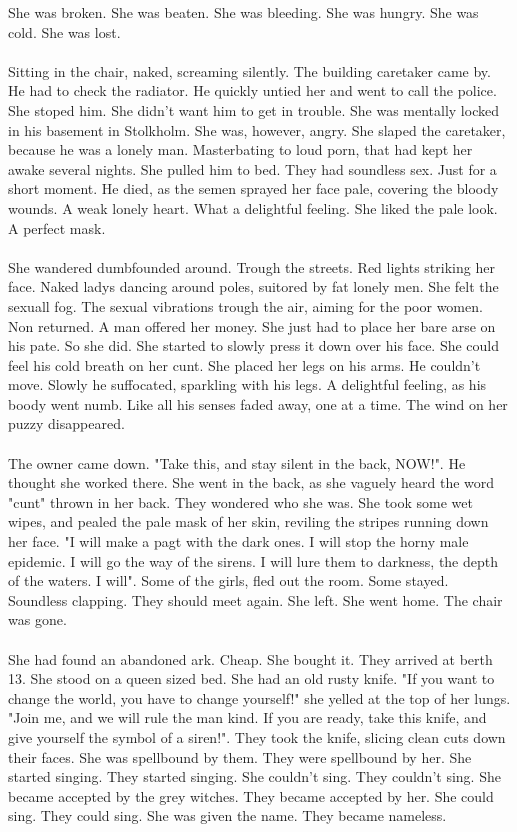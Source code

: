 \documentclass[]{article}
\begin{document}
She was broken. She was beaten. She was bleeding. She was hungry. She was cold. She was lost.
\\ \\
Sitting in the chair, naked, screaming silently. The building caretaker came by. He had to check the radiator. He quickly untied her and went to call the police. She stoped him. She didn't want him to get in trouble. She was mentally locked in his basement in Stolkholm. She was, however, angry. She slaped the caretaker, because he was a lonely man. Masterbating to loud porn, that had kept her awake several nights. She pulled him to bed. They had soundless sex. Just for a short moment. He died, as the semen sprayed her face pale, covering the bloody wounds. A weak lonely heart. What a delightful feeling. She liked the pale look. A perfect mask.
\\ \\
She wandered dumbfounded around. Trough the streets. Red lights striking her face. Naked ladys dancing around poles, suitored by fat lonely men. She felt the sexuall fog. The sexual vibrations trough the air, aiming for the poor women. Non returned. A man offered her money. She just had to place her bare arse on his pate. So she did. She started to slowly press it down over his face. She could feel his cold breath on her cunt. She placed her legs on his arms. He couldn't move. Slowly he suffocated, sparkling with his legs. A delightful feeling, as his boody went numb. Like all his senses faded away, one at a time. The wind on her puzzy disappeared. 
\\ \\
The owner came down. "Take this, and stay silent in the back, NOW!". He thought she worked there. She went in the back, as she vaguely heard the word "cunt" thrown in her back. They wondered who she was. She took some wet wipes, and pealed the pale mask of her skin, reviling the stripes running down her face. "I will make a pagt with the dark ones. I will stop the horny male epidemic. I will go the way of the sirens. I will lure them to darkness, the depth of the waters. I will". Some of the girls, fled out the room. Some stayed. Soundless clapping. They should meet again. She left. She went home. The chair was gone.
\\ \\
She had found an abandoned ark. Cheap. She bought it. They arrived at berth 13. She stood on a queen sized bed. She had an old rusty knife. "If you want to change the world, you have to change yourself!" she yelled at the top of her lungs. "Join me, and we will rule the man kind. If you are ready, take this knife, and give yourself the symbol of a siren!". They took the knife, slicing clean cuts down their faces. She was spellbound by them. They were spellbound by her. She started singing. They started singing. She couldn't sing. They couldn't sing. She became accepted by the grey witches. They became accepted by her. She could sing. They could sing. She was given the name. They became nameless.
\end{document}
